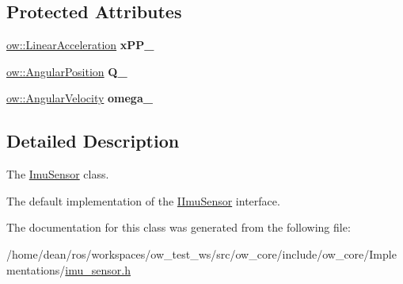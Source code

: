 \subsection*{Protected Attributes}
\begin{DoxyCompactItemize}
\item 
\hyperlink{classow__core_1_1LinearAcceleration}{ow\+::\+Linear\+Acceleration} {\bfseries x\+P\+P\+\_\+}\hypertarget{classow__core_1_1ImuSensor_a041ff957f92683213fdcee00fe94fd3e}{}\label{classow__core_1_1ImuSensor_a041ff957f92683213fdcee00fe94fd3e}

\item 
\hyperlink{classow__core_1_1AngularPosition}{ow\+::\+Angular\+Position} {\bfseries Q\+\_\+}\hypertarget{classow__core_1_1ImuSensor_a7cf3f7fdc802c0c8838ac04418ea60b6}{}\label{classow__core_1_1ImuSensor_a7cf3f7fdc802c0c8838ac04418ea60b6}

\item 
\hyperlink{classow__core_1_1AngularVelocity}{ow\+::\+Angular\+Velocity} {\bfseries omega\+\_\+}\hypertarget{classow__core_1_1ImuSensor_a5c3e1f8c791bf7118cdf30bd552b60c7}{}\label{classow__core_1_1ImuSensor_a5c3e1f8c791bf7118cdf30bd552b60c7}

\end{DoxyCompactItemize}


\subsection{Detailed Description}
The \hyperlink{classow__core_1_1ImuSensor}{Imu\+Sensor} class. 

The default implementation of the \hyperlink{classow__core_1_1IImuSensor}{I\+Imu\+Sensor} interface. 

The documentation for this class was generated from the following file\+:\begin{DoxyCompactItemize}
\item 
/home/dean/ros/workspaces/ow\+\_\+test\+\_\+ws/src/ow\+\_\+core/include/ow\+\_\+core/\+Implementations/\hyperlink{imu__sensor_8h}{imu\+\_\+sensor.\+h}\end{DoxyCompactItemize}
